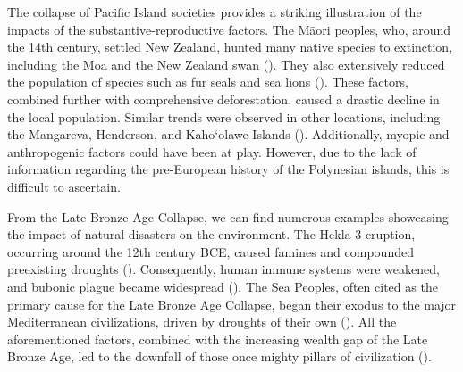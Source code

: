 \documentclass[12pt, a4paper, twoside]{article}
\begin{document}
The collapse of Pacific Island societies provides a striking illustration of the impacts of the substantive-reproductive factors. The Māori peoples, who, around the 14th century, settled New Zealand, hunted many native species to extinction, including the Moa and the New Zealand swan (\cites[p.\ 358]{walter2017polynesian}[p.\ 4922]{allentoft2014extinct}[p.\ 1]{rawlence2017blackswans}). They also extensively reduced the population of species such as fur seals and sea lions (\cite[p.\ 1]{wilmshurst2007deforestation}). These factors, combined further with comprehensive deforestation, caused a drastic decline in the local population. Similar trends were observed in other locations, including the Mangareva, Henderson, and Kaho‘olawe Islands (\cites[p.\ 5]{fagan2010great}[p.\ 132]{diamond2005collapse}[p.\ 443]{rolett2004deforestation}[p.\ 336]{diamond1994ecological}). Additionally, myopic and anthropogenic factors could have been at play. However, due to the lack of information regarding the pre-European history of the Polynesian islands, this is difficult to ascertain.  

From the Late Bronze Age Collapse, we can find numerous examples showcasing the impact of natural disasters on the environment. The Hekla 3 eruption, occurring around the 12th century BCE, caused famines and compounded preexisting droughts (\cites[p.\ 340]{baker1995hekla}[pp.\ 456–458]{yurko1999end}[p.\ 719]{manning2023hittite}). Consequently, human immune systems were weakened, and bubonic plague became widespread (\cite[p.\ 1]{spyrou2018plague}). The Sea Peoples, often cited as the primary cause for the Late Bronze Age Collapse, began their exodus to the major Mediterranean civilizations, driven by droughts of their own (\cite[pp.\ 16–17]{carpenter1966discontinuity}). All the aforementioned factors, combined with the increasing wealth gap of the Late Bronze Age, led to the downfall of those once mighty pillars of civilization (\cites[pp.\ 20–22]{basri2020wealth}{weisweiler2022inequality}). 
\end{document}

